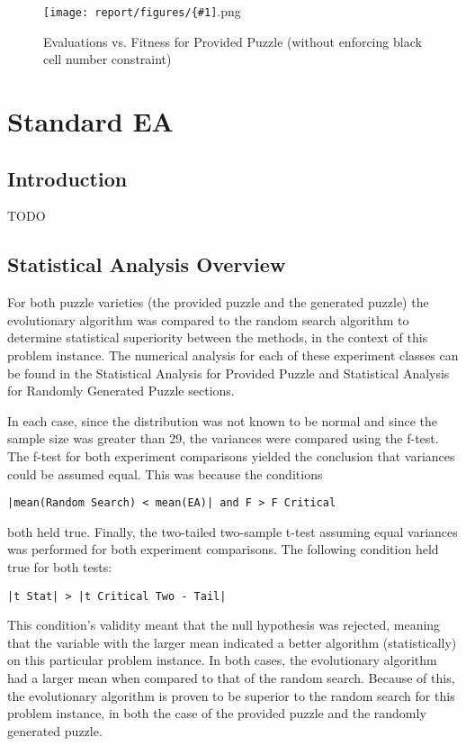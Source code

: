 \documentclass[11pt]{article}
\newcommand{\addgraphic}[1]{\centerline{\texttt{[image: report/figures/\{\#1]}.png}}}
\begin{document}
\begin{figure}[H]
    \addgraphic{website_puzzle_soln_graph}
    \caption{Evaluations vs. Fitness for Provided Puzzle (without enforcing black cell number constraint)}
    \label{fig:rand_search_web}
\end{figure}


\section{Standard EA}

\subsection{Introduction}

TODO


\subsection{Statistical Analysis Overview}

For both puzzle varieties (the provided puzzle and the generated puzzle) the 
evolutionary algorithm was compared to the random search algorithm to determine 
statistical superiority between the methods, in the context of this problem instance. 
The numerical analysis for each of these experiment classes can be found in the 
Statistical Analysis for Provided Puzzle and Statistical Analysis for Randomly 
Generated Puzzle sections.

In each case, since the distribution was not known to be normal and since the 
sample size was greater than 29, the variances were compared using the f-test. 
The f-test for both experiment comparisons yielded the conclusion that variances 
could be assumed equal. This was because the conditions 

\begin{center}
\texttt{|mean(Random Search) < mean(EA)| and F > F Critical}
\end{center}

both held true. Finally, the two-tailed two-sample t-test assuming equal variances was 
performed for both experiment comparisons. The following condition held true for both 
tests:

\begin{center}
\texttt{|t Stat| > |t Critical Two - Tail|}
\end{center}

This condition's validity meant that the null hypothesis was rejected, meaning that the 
variable with the larger mean indicated a better algorithm (statistically) on this 
particular problem instance. In both cases, the evolutionary algorithm had a 
larger mean when compared to that of the random search. Because of this, the 
evolutionary algorithm is proven to be superior to the random search for this problem 
instance, in both the case of the provided puzzle and the randomly generated puzzle.
\end{document}
